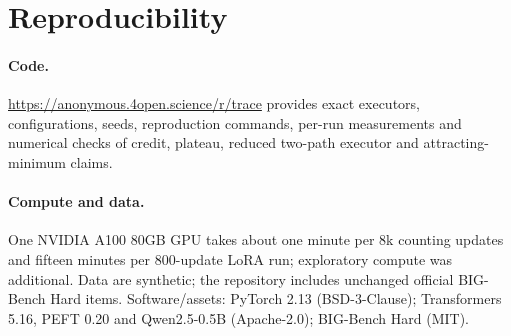 \section{Reproducibility}
\label{app:reproducibility}

\paragraph{Code.} \url{https://anonymous.4open.science/r/trace} provides exact executors,
configurations, seeds, reproduction commands, per-run measurements and numerical checks
of credit, plateau, reduced two-path executor and attracting-minimum claims.

\paragraph{Compute and data.} One NVIDIA A100 80GB GPU takes about one minute per $8$k
counting updates and fifteen minutes per $800$-update LoRA run; exploratory compute
was additional. Data are synthetic; the repository includes unchanged official BIG-Bench
Hard items. Software/assets: PyTorch 2.13 (BSD-3-Clause); Transformers 5.16, PEFT 0.20
and Qwen2.5-0.5B \citep{qwen2025qwen25} (Apache-2.0); BIG-Bench Hard
\citep{suzgun2022challenging} (MIT).
